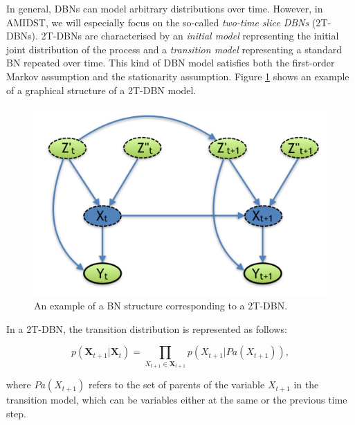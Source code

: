 In general, DBNs can model arbitrary distributions over time. However, in AMIDST,  we will especially focus on the so-called \textit{two-time slice DBNs} (2T-DBNs). 2T-DBNs are characterised by an \textit{initial model} representing the initial joint distribution of the process and a \textit{transition model} representing a standard BN repeated over time. This kind of DBN model satisfies both the first-order Markov assumption and the stationarity assumption. Figure \ref{Figure:DBN} shows an example of a graphical structure of a 2T-DBN model. 

\begin{figure}[ht!]
\begin{center}
\includegraphics[scale=0.3]{./figures/PreliminariesDBN}
\caption{\label{Figure:DBN}An example of a BN structure corresponding to a 2T-DBN.}
\end{center}
\end{figure}

In a 2T-DBN, the transition distribution is represented as follows:

$$ p(\bm X_{t+1} | \bm X_t) = \prod_{X_{t+1}\in\bm X_{t+1}} p(X_{t+1}|Pa(X_{t+1})),$$ 

\noindent where $Pa(X_{t+1})$ refers to the set of parents of the variable $X_{t+1}$ in the transition model, which can be variables either at the same or the previous time step. 

